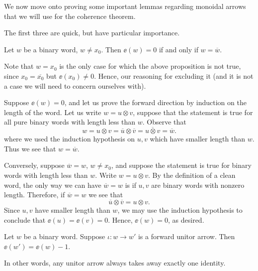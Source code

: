 We now move onto proving some important lemmas regarding 
monoidal arrows that we will use for the coherence theorem.

The first three are quick, but have particular importance. 
\begin{lemma}\label{lemma:ee(w)=0_iff_w_is_clean}
    Let $w$ be a binary word, $w \ne x_0$. 
    Then $\ee(w) = 0$ if and only if $w = \overline{w}$. 
\end{lemma}

Note that $w = x_0$ is the only case for which the above proposition is not true, 
since $x_0 = \overline{x_0}$ but $\ee(x_0) \ne 0$. Hence,
our reasoning for excluding it (and it is not a case we will need to concern ourselves with).

\begin{prf}
    Suppose $\ee(w) = 0$, and let us prove the forward direction by induction on 
    the length of the word. 
    Let us write $w = u \otimes v$, suppose that the statement is true for all pure binary words with 
    length less than $w$. Observe that  
    \[
        w = u \otimes v = \overline{u} \otimes \overline{v} = \overline{u \otimes v} = \overline{w}.
    \]
    where we used the induction hypothesis on $u, v$ which have smaller length than 
    $w$. Thus we see that $w = \overline{w}$. 

    Conversely, suppose $\overline{w} = w$, $w \ne x_0$, and suppose the statement is true for binary words 
    with length less than $w$. Write $w  = u \otimes v$. 
    By the definition 
    of a clean word, the only way we can have $\overline{w} = w$ is if $u,v$ 
    are binary words with nonzero length. 
    Therefore, if $\overline{w} = w$ we see that 
    \[
        \overline{u} \otimes \overline{v} = u \otimes v.
    \]
    Since $u, v$ have smaller length than $w$, we may use the induction 
    hypothesis to conclude that $\ee(u) = \ee(v) = 0$. Hence, 
    $\ee(w) = 0$, as desired. 
\end{prf}

\begin{lemma}\label{lemma:unitors_decrease_unit_length}
    Let $w$ be a binary word. Suppose
    $\iota: w \to w'$ is a forward unitor arrow. 
    Then $\ee(w') = \ee(w) - 1$. 
\end{lemma}

In other words, any unitor arrow always takes away exactly one identity.

